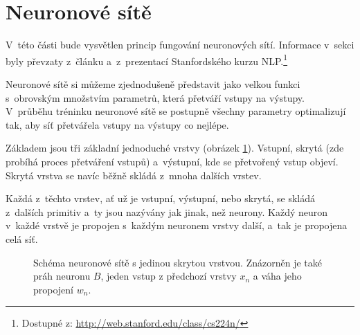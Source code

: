 \section{Neuronové sítě}
\label{neuronove_site}
V~této části bude vysvětlen princip fungování neuronových sítí. Informace v~sekci byly převzaty z~článku \cite{neural_nets} a~z~prezentací Stanfordského kurzu NLP.\footnote{Dostupné z: \url{http://web.stanford.edu/class/cs224n/}}\par
Neuronové sítě si můžeme zjednodušeně představit jako velkou funkci s~obrovským množstvím parametrů, která přetváří vstupy na výstupy. V~průběhu tréninku neuronové sítě se postupně všechny parametry optimalizují tak, aby síť přetvářela vstupy na výstupy co nejlépe.\par
Základem jsou tři základní jednoduché vrstvy (obrázek \ref{three_layers}). Vstupní, skrytá (zde probíhá proces přetváření vstupů) a~výstupní, kde se přetvořený vstup objeví. Skrytá vrstva se navíc běžně skládá z~mnoha dalších vrstev.\par
Každá z~těchto vrstev, ať už je vstupní, výstupní, nebo skrytá, se skládá z~dalších primitiv a~ty jsou nazývány jak jinak, než neurony. Každý neuron v~každé vrstvě je propojen s~každým neuronem vrstvy další, a~tak je propojena celá síť.

\begin{figure}[hbt]
	\centering
	\caption{Schéma neuronové sítě s jedinou skrytou vrstvou. Znázorněn je také práh neuronu $B$, jeden vstup z předchozí vrstvy $x_n$ a váha jeho propojení $w_n$.}
	\label{three_layers}
\end{figure}

